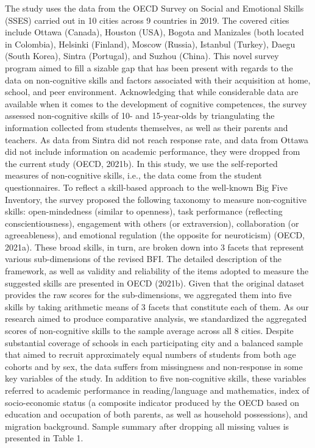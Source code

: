 \documentclass{article}
\begin{document}
The study uses the data from the OECD Survey on Social and Emotional
Skills (SSES) carried out in 10 cities across 9 countries in 2019. The
covered cities include Ottawa (Canada), Houston (USA), Bogota and
Manizales (both located in Colombia), Helsinki (Finland), Moscow
(Russia), Istanbul (Turkey), Daegu (South Korea), Sintra (Portugal), and
Suzhou (China). This novel survey program aimed to fill a sizable gap
that has been present with regards to the data on non-cognitive skills
and factors associated with their acquisition at home, school, and peer
environment. Acknowledging that while considerable data are available
when it comes to the development of cognitive competences, the survey
assessed non-cognitive skills of 10- and 15-year-olds by triangulating
the information collected from students themselves, as well as their
parents and teachers. As data from Sintra did not reach response rate,
and data from Ottawa did not include information on academic
performance, they were dropped from the current study (OECD, 2021b). In
this study, we use the self-reported measures of non-cognitive skills,
i.e., the data come from the student questionnaires. To reflect a
skill-based approach to the well-known Big Five Inventory, the survey
proposed the following taxonomy to measure non-cognitive skills:
open-mindedness (similar to openness), task performance (reflecting
conscientiousness), engagement with others (or extraversion),
collaboration (or agreeableness), and emotional regulation (the opposite
for neuroticism) (OECD, 2021a). These broad skills, in turn, are broken
down into 3 facets that represent various sub-dimensions of the revised
BFI. The detailed description of the framework, as well as validity and
reliability of the items adopted to measure the suggested skills are
presented in OECD (2021b). Given that the original dataset provides the
raw scores for the sub-dimensions, we aggregated them into five skills
by taking arithmetic means of 3 facets that constitute each of them. As
our research aimed to produce comparative analysis, we standardized the
aggregated scores of non-cognitive skills to the sample average across
all 8 cities. Despite substantial coverage of schools in each
participating city and a balanced sample that aimed to recruit
approximately equal numbers of students from both age cohorts and by
sex, the data suffers from missingness and non-response in some key
variables of the study. In addition to five non-cognitive skills, these
variables referred to academic performance in reading/language and
mathematics, index of socio-economic status (a composite indicator
produced by the OECD based on education and occupation of both parents,
as well as household possessions), and migration background. Sample
summary after dropping all missing values is presented in Table 1.
\end{document}
